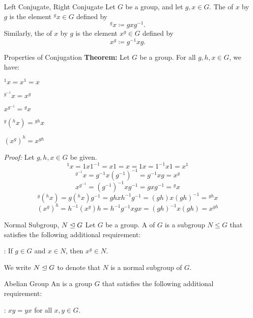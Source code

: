 \documentclass[12pt]{report}
\begin{document}
\begin{dfnbox}{Left Conjugate, Right Conjugate}
	Let $G$ be a group, and let $g, x \in G$. The  of $x$ by $g$ is the element ${}^g x \in G$ defined by
	\[ {}^g x \coloneq g x g^{-1}. \]
	Similarly, the  of $x$ by $g$ is the element $x^g \in G$ defined by
	\[ x^g \coloneq g^{-1} x g. \]
\end{dfnbox}

\begin{thmbox}{Properties of Conjugation}
	\textbf{Theorem:} Let $G$ be a group. For all $g, h, x \in G$, we have:
	\begin{dfnitems}
		\item ${}^1 x = x^1 = x$
		\item ${}^{g^{-1}} x = x^g$
		\item $x^{g^{-1}} = {}^g x$
		\item ${}^{g} ({}^{h} x) = {}^{gh} x$
		\item $(x^g)^h = x^{gh}$
	\end{dfnitems}
\tcblower
	\textit{Proof:} Let $g, h, x \in G$ be given.
	\[ {}^1 x = 1 x 1^{-1} = x1 = x = 1x = 1^{-1} x 1 = x^1 \]
	\[ {}^{g^{-1}} x = g^{-1} x (g^{-1})^{-1} = g^{-1} x g = x^g \]
	\[ x^{g^{-1}} = (g^{-1})^{-1} x g^{-1} = g x g^{-1} = {}^g x \]
	\[ {}^{g} ({}^{h} x) = g ({}^h x) g^{-1} = g h x h^{-1} g^{-1} = (gh) x (gh)^{-1} = {}^{gh} x \]
	\[ (x^g)^h = h^{-1} (x^g) h = h^{-1} g^{-1} x g x = (gh)^{-1} x (gh) = x^{gh} \]
\end{thmbox}

\begin{dfnbox}{Normal Subgroup, $N \trianglelefteq G$}
	Let $G$ be a group. A  of $G$ is a subgroup $N \le G$ that satisfies the following additional requirement:
	\begin{dfnitems}
		\item {}: If $g \in G$ and $x \in N$, then $x^g \in N$.
	\end{dfnitems}
	We write $N \trianglelefteq G$ to denote that $N$ is a normal subgroup of $G$.
\end{dfnbox}

\begin{dfnbox}{Abelian Group}
	An  is a group $G$ that satisfies the following additional requirement:
	\begin{dfnitems}
		\item {}: $x y = y x$ for all $x, y \in G$.
	\end{dfnitems}
\end{dfnbox}
\end{document}
